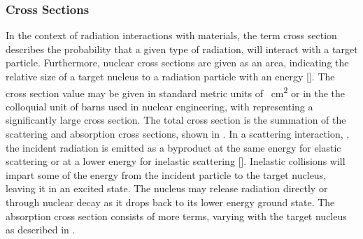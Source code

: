 \documentclass[../../../../main.tex]{subfiles}
\begin{document}
    \subsubsection{Cross Sections}%
    \label{sec:chapter-2:radiation-detection:neutron-interactions:cross-sections}%
    In the context of radiation interactions with materials, the term cross section describes the probability that a given type of radiation, will interact with a target particle.
    Furthermore, nuclear cross sections  are given as an area, indicating the relative size of a target nucleus to a radiation particle with an energy [].
    The cross section value may be given in standard metric units of \SI{}{\centi\meter\squared} or in the the colloquial unit of barns used in nuclear engineering, with  representing a significantly large cross section.
    The total cross section  is the summation of the scattering  and absorption  cross sections, shown in .%
    In a scattering interaction, , the incident radiation is emitted as a byproduct at the same energy for elastic scattering  or at a lower energy for inelastic scattering [].%
    Inelastic collisions will impart some of the energy from the incident particle to the target nucleus, leaving it in an excited state.
    The nucleus may release radiation directly or through nuclear decay as it drops back to its lower energy ground state.
    The absorption cross section  consists of more terms, varying with the target nucleus as described in .%
\end{document}

